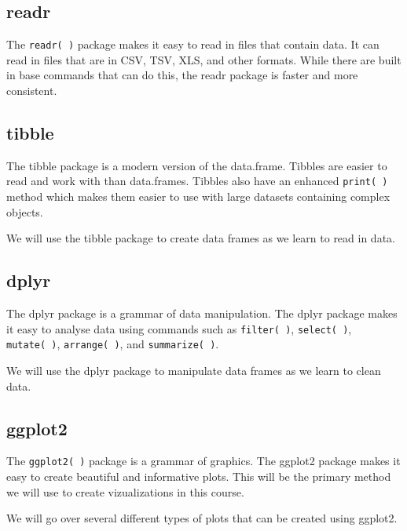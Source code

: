 \documentclass[
  letterpaper,
  DIV=11,
  numbers=noendperiod]{scrreprt}
\begin{document}
\subsection*{readr}\label{readr}

The \texttt{readr(\ )} package makes it easy to read in files that
contain data. It can read in files that are in CSV, TSV, XLS, and other
formats. While there are built in base commands that can do this, the
readr package is faster and more consistent.

\subsection*{tibble}\label{tibble}

The tibble package is a modern version of the data.frame. Tibbles are
easier to read and work with than data.frames. Tibbles also have an
enhanced \texttt{print(\ )} method which makes them easier to use with
large datasets containing complex objects.

We will use the tibble package to create data frames as we learn to read
in data.

\subsection*{dplyr}\label{dplyr}

The dplyr package is a grammar of data manipulation. The dplyr package
makes it easy to analyse data using commands such as
\texttt{filter(\ )}, \texttt{select(\ )}, \texttt{mutate(\ )},
\texttt{arrange(\ )}, and \texttt{summarize(\ )}.

We will use the dplyr package to manipulate data frames as we learn to
clean data.

\subsection*{ggplot2}\label{ggplot2}

The \texttt{ggplot2(\ )} package is a grammar of graphics. The ggplot2
package makes it easy to create beautiful and informative plots. This
will be the primary method we will use to create vizualizations in this
course.

We will go over several different types of plots that can be created
using ggplot2.
\end{document}
